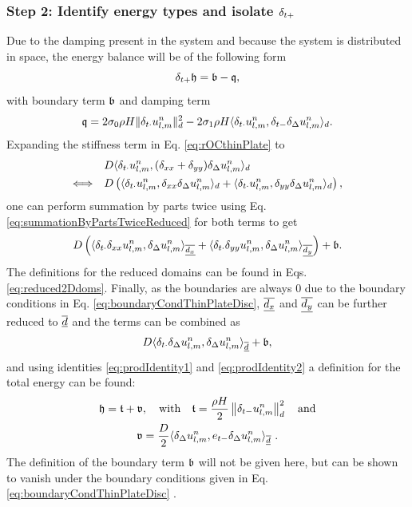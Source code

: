 {\subsubsection{Step 2: Identify energy types and isolate $\delta_{t+}$}
Due to the damping present in the system and because the system is distributed in space, the energy balance will be of the following form
\begin{equation*}
    \delta_{t+} \mathfrak{h} = \mathfrak{b}-\mathfrak{q}, 
\end{equation*}
with boundary term $\mathfrak{b}$ and damping term
\begin{equation}\label{eq:dampingTermThinPlate}
    \mathfrak{q} = 2\sigma_{0} \rho H \lVert\delta_{t\cdot}u_{l,m}^n\rVert_d^2 - 2 \sigma_{1} \rho H \langle \delta_{t\cdot} u_{l,m}^n, \delta_{t-} \delta_{\Delta}u_{l,m}^n \rangle_d.
\end{equation}
Expanding the stiffness term in Eq. \eqref{eq:rOCthinPlate} to
\begin{align*}
    &\ D\langle \delta_{t\cdot} u_{l,m}^n, (\delta_{xx} + \delta_{yy})\delta_{\Delta} u_{l,m}^n \rangle_d\\
    \Longleftrightarrow\ \ &\ D\left(\langle \delta_{t\cdot} u_{l,m}^n, \delta_{xx}\delta_{\Delta} u_{l,m}^n \rangle_d + \langle \delta_{t\cdot} u_{l,m}^n, \delta_{yy}\delta_{\Delta} u_{l,m}^n \rangle_d\right),
\end{align*} 
one can perform summation by parts twice using Eq. \eqref{eq:summationByPartsTwiceReduced} for both terms to get
\begin{equation*}
    D\left(\langle \delta_{t\cdot} \delta_{xx}u_{l,m}^n, \delta_{\Delta} u_{l,m}^n \rangle_{\underline{\overline{d_x}}} + \langle \delta_{t\cdot}\delta_{yy} u_{l,m}^n, \delta_{\Delta} u_{l,m}^n \rangle_{\underline{\overline{d_y}}}\right) + \mathfrak{b}.
\end{equation*}
The definitions for the reduced domains can be found in Eqs. \eqref{eq:reduced2Ddoms}. Finally, as the boundaries are always $0$ due to the boundary conditions in Eq. \eqref{eq:boundaryCondThinPlateDisc}, $\underline{\overline{d_x}}$ and $\underline{\overline{d_y}}$ can be further reduced to $\underline{\overline{d}}$ and the terms can be combined as 
\begin{equation*}
    D\langle \delta_{t\cdot}\delta_{\Delta}u_{l,m}^n, \delta_{\Delta} u_{l,m}^n \rangle_{\underline{\overline{d}}} + \mathfrak{b} ,
\end{equation*}
and using identities \eqref{eq:prodIdentity1} and \eqref{eq:prodIdentity2} a definition for the total energy can be found:
\begin{equation}\label{eq:energyBalanceThinPlate}
    \begin{gathered}
        \mathfrak{h} = \mathfrak{t} + \mathfrak{v}, \quad \text{with} \quad \mathfrak{t} = \frac{\rho H}{2} \left\lVert\delta_{t-}u_{l,m}^n\right\rVert_{d}^2 \quad \text{and} \\
        \mathfrak{v} = \frac{D}{2}\langle\delta_{\Delta} u_{l,m}^n, e_{t-}\delta_{\Delta} u_{l,m}^n\rangle_{\overline{\underline{d}}}\ .
    \end{gathered}
\end{equation}
The definition of the boundary term $\mathfrak{b}$ will not be given here, but can be shown to vanish under the boundary conditions given in Eq. \eqref{eq:boundaryCondThinPlateDisc} \cite{theBible}.

}

